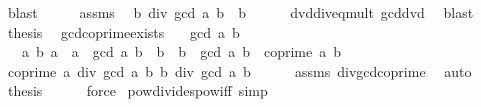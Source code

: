 \begin{isabellebody}
\ blast\isanewline
\ \ \isamarkupfalse%
\ \isamarkupfalse%
\ assms\ \isamarkupfalse%
\ {\isachardoublequoteopen}b\ div\ gcd\ a\ b\ {\isacharequal}{\kern0pt}\ b{\isacharprime}{\kern0pt}{\isachardoublequoteclose}\isanewline
\ \ \ \ \isamarkupfalse%
\ dvd{\isacharunderscore}{\kern0pt}div{\isacharunderscore}{\kern0pt}eq{\isacharunderscore}{\kern0pt}mult\ gcd{\isacharunderscore}{\kern0pt}dvd{}\ \isamarkupfalse%
\ blast\isanewline
\ \ \isamarkupfalse%
\ \isamarkupfalse%
\ {\isacharquery}{\kern0pt}thesis\ \isacommand{{\isachardot}{\kern0pt}}\isamarkupfalse%
\isanewline
{}\isamarkupfalse%
%
\endisatagproof
{\isafoldproof}%
%
\isadelimproof
\isanewline
%
\endisadelimproof
\isanewline
{}\isamarkupfalse%
\ gcd{\isacharunderscore}{\kern0pt}coprime{\isacharunderscore}{\kern0pt}exists{\isacharcolon}{\kern0pt}\isanewline
\ \ \ {\isachardoublequoteopen}gcd\ a\ b\ {\isasymnoteq}\ {}{\isachardoublequoteclose}\isanewline
\ \ \ {\isachardoublequoteopen}{\isasymexists}a{\isacharprime}{\kern0pt}\ b{\isacharprime}{\kern0pt}{\isachardot}{\kern0pt}\ a\ {\isacharequal}{\kern0pt}\ a{\isacharprime}{\kern0pt}\ {\isacharasterisk}{\kern0pt}\ gcd\ a\ b\ {\isasymand}\ b\ {\isacharequal}{\kern0pt}\ b{\isacharprime}{\kern0pt}\ {\isacharasterisk}{\kern0pt}\ gcd\ a\ b\ {\isasymand}\ coprime\ a{\isacharprime}{\kern0pt}\ b{\isacharprime}{\kern0pt}{\isachardoublequoteclose}\isanewline
%
\isadelimproof
%
\endisadelimproof
%
\isatagproof
{}\isamarkupfalse%
\ {\isacharminus}{\kern0pt}\isanewline
\ \ \isamarkupfalse%
\ {\isachardoublequoteopen}coprime\ {\isacharparenleft}{\kern0pt}a\ div\ gcd\ a\ b{\isacharparenright}{\kern0pt}\ {\isacharparenleft}{\kern0pt}b\ div\ gcd\ a\ b{\isacharparenright}{\kern0pt}{\isachardoublequoteclose}\isanewline
\ \ \ \ \isamarkupfalse%
\ assms\ div{\isacharunderscore}{\kern0pt}gcd{\isacharunderscore}{\kern0pt}coprime\ \isamarkupfalse%
\ auto\isanewline
\ \ \isamarkupfalse%
\ \isamarkupfalse%
\ {\isacharquery}{\kern0pt}thesis\isanewline
\ \ \ \ \isamarkupfalse%
\ force\isanewline
{}\isamarkupfalse%
%
\endisatagproof
{\isafoldproof}%
%
\isadelimproof
\isanewline
%
\endisadelimproof
\isanewline
{}\isamarkupfalse%
\ pow{\isacharunderscore}{\kern0pt}divides{\isacharunderscore}{\kern0pt}pow{\isacharunderscore}{\kern0pt}iff\ {\isacharbrackleft}{\kern0pt}simp{\isacharbrackright}{\kern0pt}{\isacharcolon}{\kern0pt}\isanewline

\end{isabellebody}
